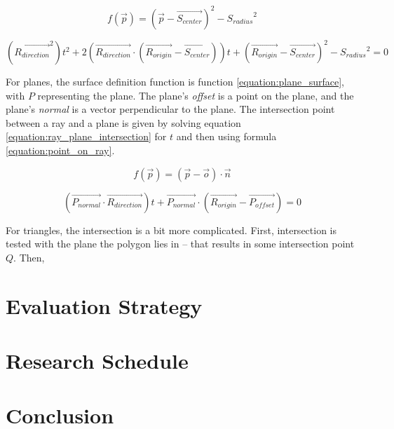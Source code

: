 \documentclass[11pt]{article}
\newcommand{\rayorg}{\vec{R_{origin}}}
\newcommand{\raydir}{\vec{R_{direction}}}
\begin{document}
\begin{equation}
  \label{equation:sphere_surface}
  f(\vec{p}) = (\vec{p} - \vec{S_{center}})^2 - {S_{radius}}^2
\end{equation}

\begin{equation}
  \label{equation:ray_sphere_intersection}
  (\raydir^2)t^2 + 2(\raydir \cdot (\rayorg - \vec{S_{center}}))t + (\rayorg - \vec{S_{center}})^2 - {S_{radius}}^2 = 0
\end{equation}

For planes, the surface definition function is function \ref{equation:plane_surface}, with $P$ representing the plane.
The plane's {\it offset} is a point on the plane, and the plane's {\it normal} is a vector perpendicular to the plane.
The intersection point between a ray and a plane is given by solving equation \ref{equation:ray_plane_intersection} for $t$ and then using formula \ref{equation:point_on_ray}.

\begin{equation}
  \label{equation:plane_surface}
  f(\vec{p}) = (\vec{p} - \vec{o}) \cdot \vec{n}
\end{equation}

\begin{equation}
  \label{equation:ray_plane_intersection}
  (\vec{P_{normal}} \cdot \raydir)t + \vec{P_{normal}} \cdot (\rayorg - \vec{P_{offset}}) = 0
\end{equation}

For triangles, the intersection is a bit more complicated. First, intersection is tested with the plane the polygon lies in -- that results in some intersection point $Q$. Then,


\section{Evaluation Strategy}
\label{sec:evaluate}


\section{Research Schedule}
\label{sec:schedule}


\section{Conclusion}
\label{sec:conclusion}




\end{document}
